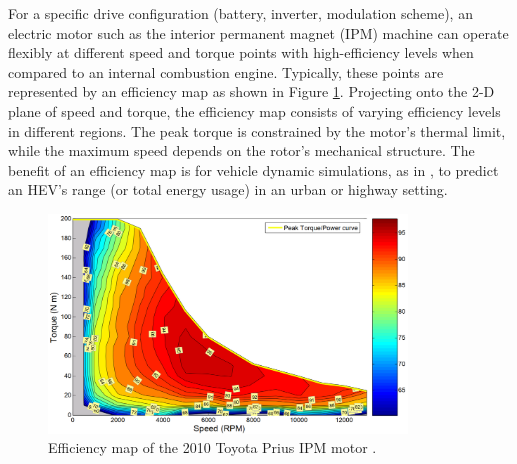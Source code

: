 For a specific drive configuration (battery, inverter, modulation scheme), an electric motor such as the interior permanent magnet (IPM) machine can operate flexibly at different speed and torque points with high-efficiency levels when compared to an internal combustion engine. Typically, these points are represented by an efficiency map as shown in Figure \ref{fig:RNN_Fig-0}. Projecting onto the 2-D plane of speed and torque, the efficiency map consists of varying efficiency levels in different regions. The peak torque is constrained by the motor’s thermal limit, while the maximum speed depends on the rotor’s mechanical structure. The benefit of an efficiency map is for vehicle dynamic simulations, as in \parencite{mahmoudi2015efficiency}, to predict an HEV’s range (or total energy usage) in an urban or highway setting.

\begin{figure}[h!]
    \centering
    \includegraphics[width=0.85\textwidth]{Figures/Chp_RNN/Fig 0.png}
    \caption{Efficiency map of the 2010 Toyota Prius IPM motor \parencite{mahmoudi2015efficiency}.}
    \label{fig:RNN_Fig-0}
\end{figure}

